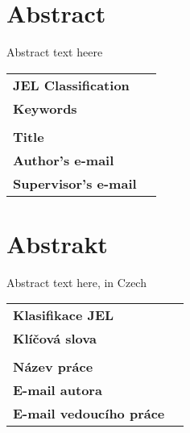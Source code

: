\section*{Abstract}

Abstract text heere


\bigskip

\begin{tabular}{lp{8.6cm}}
    	\textbf{JEL Classification} & \JEL \\
		\textbf{Keywords} & \Keywords \\
 		& \\
		\textbf{Title} & \Bookname \\
 		\textbf{Author's e-mail} & \texttt{\href{mailto:\Email}{\Email}}\\
		\textbf{Supervisor's e-mail} & \texttt{\href{mailto:\EmailSup}{\EmailSup}}\\
\end{tabular}

\clearpage

\section*{Abstrakt}\label{abstract}

Abstract text here, in Czech




\bigskip

\begin{tabular}{lp{7.7cm}}
		\textbf{Klasifikace JEL} & \JEL \\
		\textbf{Kl\'{i}\v{c}ov\'{a} slova} & \Klic \\
 		& \\
		\textbf{N\'{a}zev pr\'{a}ce} & \BooknameCZ \\
 		\textbf{E-mail autora} & \texttt{\href{mailto:\Email}{\Email}}\\
		\textbf{E-mail vedouc\'{i}ho pr\'{a}ce} & \texttt{\href{mailto:\EmailSup}{\EmailSup}}\\
\end{tabular}

